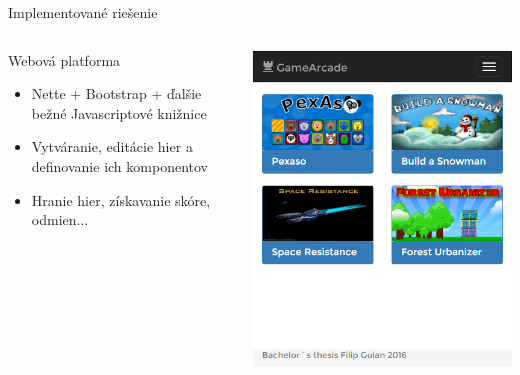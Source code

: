 \documentclass[10pt]{beamer}
\begin{document}
\begin{frame}[fragile]{Implementované riešenie}
\begin{columns}
\begin{column}{0.5\textwidth}

   \begin{block}{Webová platforma}
		\begin{itemize}
            \item Nette + Bootstrap + ďalšie bežné Javascriptové knižnice
            \item Vytváranie, editácie hier a definovanie ich komponentov
            \item Hranie hier, získavanie skóre, odmien...
            \end{itemize}
	\end{block}
	
\end{column}
\begin{column}{0.5\textwidth}  %
    \begin{center}
     \includegraphics[width=1\textwidth]{fig/ukazka-responzivity.png}
     \end{center}
\end{column}
\end{columns}
\end{frame}
\end{document}
